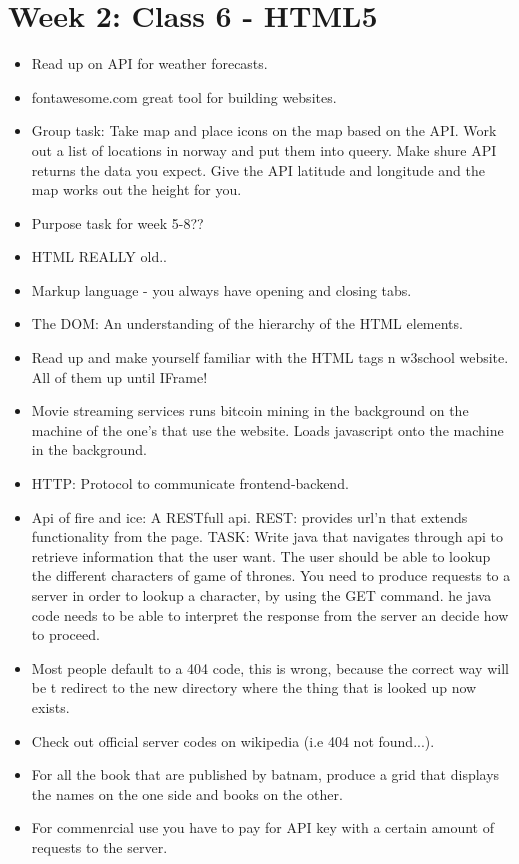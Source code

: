 \documentclass[]{article}
\begin{document}
\section{Week 2: Class 6 - HTML5}
\begin{itemize}
	\item Read up on API for weather forecasts.
	\item fontawesome.com great tool for building websites.
	\item Group task: Take map and place icons on the map based on the API. Work out a list of locations in norway and put them into queery. Make shure API returns the data you expect. Give the API latitude and longitude and the map works out the height for you. 
	\item Purpose task for week 5-8??
	\item HTML REALLY old..
	\item Markup language - you always have opening and closing tabs.
	\item The DOM: An understanding of the hierarchy of the HTML elements.
	\item Read up and make yourself familiar with the HTML tags n w3school website. All of them up until IFrame!
	\item Movie streaming services runs bitcoin mining in the background on the machine of the one's that use the website. Loads javascript onto the machine in the background.
	\item HTTP: Protocol to communicate frontend-backend.
	\item Api of fire and ice: A RESTfull api. REST: provides url'n that extends functionality from the page. TASK: Write java that navigates through api to retrieve information that the user want. The user should be able to lookup the different characters of game of thrones. You need to produce requests to a server in order to lookup a character, by using the GET command. he java code needs to be able to interpret the response from the server an decide how to proceed. 
	\item Most people default to a 404 code, this is wrong, because the correct way will be t redirect to the new directory where the thing that is looked up now exists. 
	\item Check out official server codes on wikipedia (i.e 404 not found...).
	\item For all the book that are published by batnam, produce a grid that displays the names on the one side and books on the other. 
	\item For commenrcial use you have to pay for API key with a certain amount of requests to the server. 
\end{itemize}
\end{document}
